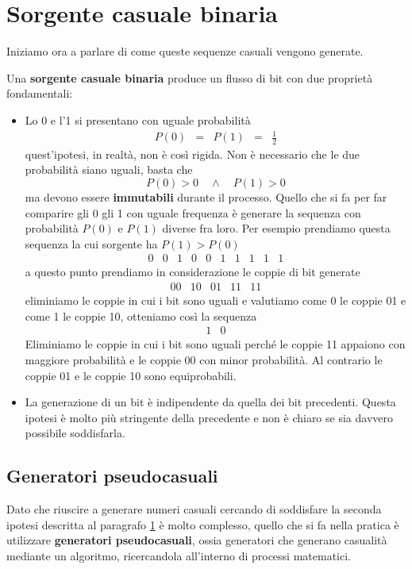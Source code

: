 \section{Sorgente casuale binaria}\label{sorgente_binaria}
Iniziamo ora a parlare di come queste sequenze casuali vengono generate.

\begin{definition}
	Una \textbf{sorgente casuale binaria} produce un flusso di bit con due propriet\`a fondamentali:
	\begin{itemize}
		\item Lo 0 e l'1 si presentano con uguale probabilit\`a
		      \[ \begin{matrix} P(0) & = & P(1) & = & \displaystyle\frac{1}{2} \end{matrix} \]
		      quest'ipotesi, in realt\`a, non \`e cos\`i rigida. Non \`e necessario che le due probabilit\`a siano
		      uguali, basta che
		      \[ P(0) > 0 \quad \wedge \quad P(1) > 0 \]
		      ma devono essere \textbf{immutabili} durante il processo. Quello che si fa per far comparire gli 0
		      gli 1 con uguale frequenza \`e generare la sequenza con probabilit\`a $P(0)$ e $P(1)$ diverse fra loro.
		      Per esempio prendiamo questa sequenza la cui sorgente ha $P(1) > P(0)$
		      \[ \begin{matrix} 0 & 0 & 1 & 0 & 0 & 1 & 1 & 1 & 1 & 1 \end{matrix} \]
		      a questo punto prendiamo in considerazione le coppie di bit generate
		      \[ \begin{matrix} 00 & 10 & 01 & 11 & 11 \end{matrix} \]
		      eliminiamo le coppie in cui i bit sono uguali e valutiamo come 0 le coppie 01 e come 1 le coppie 10,
		      otteniamo cos\`i la sequenza
		      \[ \begin{matrix} 1 & 0 \end{matrix} \]
		      Eliminiamo le coppie in cui i bit sono uguali perch\'e le coppie 11 appaiono con maggiore probabilit\`a
		      e le coppie 00 con minor probabilit\`a. Al contrario le coppie 01 e le coppie 10 sono equiprobabili.
		\item La generazione di un bit \`e indipendente da quella dei bit precedenti. Questa ipotesi \`e molto pi\`u
		      stringente della precedente e non \`e chiaro se sia davvero possibile soddisfarla.
	\end{itemize}
\end{definition}

\subsection{Generatori pseudocasuali}
Dato che riuscire a generare numeri casuali cercando di soddisfare la seconda ipotesi descritta al paragrafo
\ref{sorgente_binaria} \`e molto complesso, quello che si fa nella pratica \`e utilizzare
\textbf{generatori pseudocasuali}, ossia generatori che generano casualit\`a mediante un algoritmo, ricercandola
all'interno di processi matematici.

